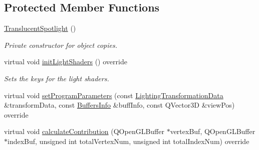 \subsection*{Protected Member Functions}
\begin{DoxyCompactItemize}
\item 
\mbox{\label{class_geometry_engine_1_1_geometry_world_item_1_1_geometry_light_1_1_translucent_spotlight_aa9aace4fcf601e8c5586bf20ae6f1695}} 
\mbox{\hyperlink{class_geometry_engine_1_1_geometry_world_item_1_1_geometry_light_1_1_translucent_spotlight_aa9aace4fcf601e8c5586bf20ae6f1695}{Translucent\+Spotlight}} ()
\begin{DoxyCompactList}\small\item\em Private constructor for object copies. \end{DoxyCompactList}\item 
\mbox{\label{class_geometry_engine_1_1_geometry_world_item_1_1_geometry_light_1_1_translucent_spotlight_ae8892fb224eea61e0fe4cedf64dddcdd}} 
virtual void \mbox{\hyperlink{class_geometry_engine_1_1_geometry_world_item_1_1_geometry_light_1_1_translucent_spotlight_ae8892fb224eea61e0fe4cedf64dddcdd}{init\+Light\+Shaders}} () override
\begin{DoxyCompactList}\small\item\em Sets the keys for the light shaders. \end{DoxyCompactList}\item 
virtual void \mbox{\hyperlink{class_geometry_engine_1_1_geometry_world_item_1_1_geometry_light_1_1_translucent_spotlight_ac94fc2764e457899a480cd6442aa18cc}{set\+Program\+Parameters}} (const \mbox{\hyperlink{class_geometry_engine_1_1_lighting_transformation_data}{Lighting\+Transformation\+Data}} \&transform\+Data, const \mbox{\hyperlink{class_geometry_engine_1_1_buffers_info}{Buffers\+Info}} \&buff\+Info, const Q\+Vector3D \&view\+Pos) override
\item 
virtual void \mbox{\hyperlink{class_geometry_engine_1_1_geometry_world_item_1_1_geometry_light_1_1_translucent_spotlight_a19c2953098d4b1388b9693be79989199}{calculate\+Contribution}} (Q\+Open\+G\+L\+Buffer $\ast$vertex\+Buf, Q\+Open\+G\+L\+Buffer $\ast$index\+Buf, unsigned int total\+Vertex\+Num, unsigned int total\+Index\+Num) override
\item 

\end{DoxyCompactItemize}
